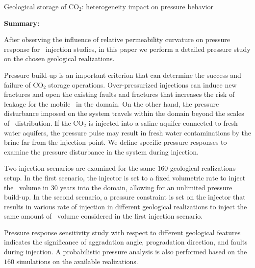 {Geological storage of CO$_2$: heterogeneity impact on pressure behavior}
{\textbf{Summary:}

After observing the influence of relative permeability curvature on pressure
response for \coo\ injection studies, in this paper we perform a
detailed pressure study on the chosen geological realizations.

Pressure build-up is an important criterion that can determine the success and failure of
$\mbox{CO}_2$ storage operations. Over-pressurized injections can induce
new fractures and open the existing faults and fractures that increases the risk
of leakage for the mobile \coo\ in the domain. On the other
hand, the pressure disturbance imposed on the system travels within the
domain beyond the scales of \coo\ distribution. If the CO$_2$ is
injected into a saline aquifer connected to fresh water aquifers, the pressure
pulse may result in fresh water contaminations by the brine far from the
injection point. We define specific pressure responses to examine the pressure
disturbance in the system during injection.

Two injection scenarios are examined for the same $160$ geological realizations
setup. In the first scenario, the injector is set to a fixed volumetric rate to
inject the \coo\ volume in $30$ years into the domain, allowing for an
unlimited pressure build-up. In the second scenario, a pressure constraint is
set on the injector that results in various rate of injection in different
geological realizations to inject the same amount of \coo\ volume
considered in the first injection scenario. 

Pressure response sensitivity study with respect to different geological
features indicates the significance of aggradation angle, progradation
direction, and faults during injection. A probabilistic pressure analysis is
also performed based on the $160$ simulations on the available realizations.
}

